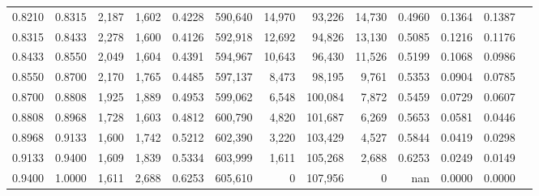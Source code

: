 \begin{tabular}{rrrrrrrrrrrrr}
0.8210 & 0.8315 &  2,187 & 1,602 &                                     0.4228 & 590,640 &  14,970 &  93,226 &  14,730 & 0.4960 & 0.1364 & 0.1387 \\
0.8315 & 0.8433 &  2,278 & 1,600 &                                     0.4126 & 592,918 &  12,692 &  94,826 &  13,130 & 0.5085 & 0.1216 & 0.1176 \\
0.8433 & 0.8550 &  2,049 & 1,604 &                                     0.4391 & 594,967 &  10,643 &  96,430 &  11,526 & 0.5199 & 0.1068 & 0.0986 \\
0.8550 & 0.8700 &  2,170 & 1,765 &                                     0.4485 & 597,137 &   8,473 &  98,195 &   9,761 & 0.5353 & 0.0904 & 0.0785 \\
0.8700 & 0.8808 &  1,925 & 1,889 &                                     0.4953 & 599,062 &   6,548 & 100,084 &   7,872 & 0.5459 & 0.0729 & 0.0607 \\
0.8808 & 0.8968 &  1,728 & 1,603 &                                     0.4812 & 600,790 &   4,820 & 101,687 &   6,269 & 0.5653 & 0.0581 & 0.0446 \\
0.8968 & 0.9133 &  1,600 & 1,742 &                                     0.5212 & 602,390 &   3,220 & 103,429 &   4,527 & 0.5844 & 0.0419 & 0.0298 \\
0.9133 & 0.9400 &  1,609 & 1,839 &                                     0.5334 & 603,999 &   1,611 & 105,268 &   2,688 & 0.6253 & 0.0249 & 0.0149 \\
0.9400 & 1.0000 &  1,611 & 2,688 &                                     0.6253 & 605,610 &       0 & 107,956 &       0 &    nan & 0.0000 & 0.0000 \\
\bottomrule
\end{tabular}
